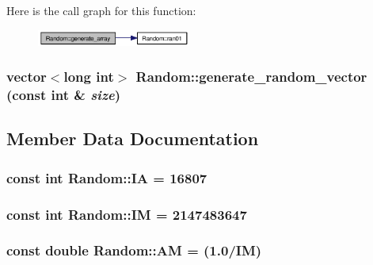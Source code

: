 Here is the call graph for this function:\nopagebreak
\begin{figure}[H]
\begin{center}
\leavevmode
\includegraphics[width=143pt]{classRandom_d910cd5ff76a472b480f7917fbd7731c_cgraph}
\end{center}
\end{figure}
\hypertarget{classRandom_cc60a9ae73a1d6f8bd85211253228d7d}{
\subsubsection{\setlength{\rightskip}{0pt plus 5cm}vector$<$long int$>$ Random::generate\_\-random\_\-vector (const int \& {\em size})}}
\label{classRandom_cc60a9ae73a1d6f8bd85211253228d7d}




\subsection{Member Data Documentation}
\hypertarget{classRandom_d46d9384a3a1d20b9aa4d2476c274993}{
\subsubsection{\setlength{\rightskip}{0pt plus 5cm}const int {\bf Random::IA} = 16807}}
\label{classRandom_d46d9384a3a1d20b9aa4d2476c274993}


\hypertarget{classRandom_951998ee091a5acf5337e1c215e66f6e}{
\subsubsection{\setlength{\rightskip}{0pt plus 5cm}const int {\bf Random::IM} = 2147483647}}
\label{classRandom_951998ee091a5acf5337e1c215e66f6e}


\hypertarget{classRandom_12ab86946d6892b1bbca4640314c4836}{
\subsubsection{\setlength{\rightskip}{0pt plus 5cm}const double {\bf Random::AM} = (1.0/{\bf IM})}}
\label{classRandom_12ab86946d6892b1bbca4640314c4836}


